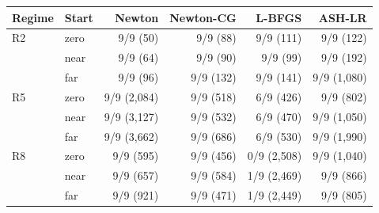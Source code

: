 \begin{tabular}{llrrrr}
\toprule
Regime & Start & Newton & Newton-CG & L-BFGS & ASH-LR \\
\midrule
R2 & zero & 9/9 (50) & 9/9 (88) & 9/9 (111) & 9/9 (122) \\
 & near & 9/9 (64) & 9/9 (90) & 9/9 (99) & 9/9 (192) \\
 & far & 9/9 (96) & 9/9 (132) & 9/9 (141) & 9/9 (1,080) \\
\midrule
R5 & zero & 9/9 (2,084) & 9/9 (518) & 6/9 (426) & 9/9 (802) \\
 & near & 9/9 (3,127) & 9/9 (532) & 6/9 (470) & 9/9 (1,050) \\
 & far & 9/9 (3,662) & 9/9 (686) & 6/9 (530) & 9/9 (1,990) \\
\midrule
R8 & zero & 9/9 (595) & 9/9 (456) & 0/9 (2,508) & 9/9 (1,040) \\
 & near & 9/9 (657) & 9/9 (584) & 1/9 (2,469) & 9/9 (866) \\
 & far & 9/9 (921) & 9/9 (471) & 1/9 (2,449) & 9/9 (805) \\
\bottomrule
\end{tabular}